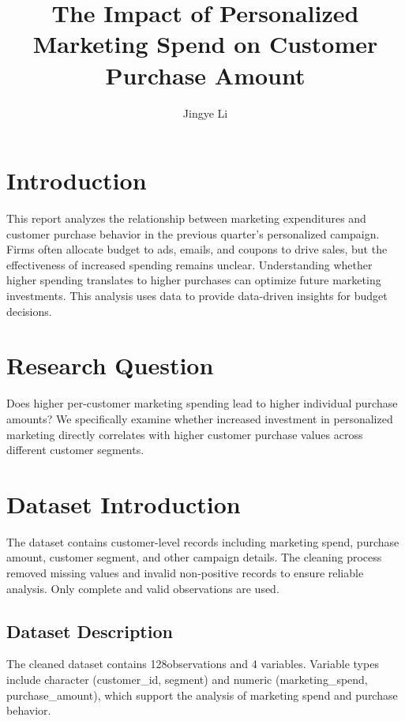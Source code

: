 \documentclass[
  letterpaper,
  DIV=11,
  numbers=noendperiod]{scrartcl}
\title{The Impact of Personalized Marketing Spend on Customer Purchase
Amount}
\author{Jingye Li}
\date{}
\renewcommand*\contentsname{Table of contents}
\newcommand\contentsname{Table of contents}
\begin{document}
\maketitle

\renewcommand*\contentsname{Table of contents}
{
\setcounter{tocdepth}{3}
\tableofcontents
}

\section{Introduction}\label{introduction}

This report analyzes the relationship between marketing expenditures and
customer purchase behavior in the previous quarter's personalized
campaign. Firms often allocate budget to ads, emails, and coupons to
drive sales, but the effectiveness of increased spending remains
unclear. Understanding whether higher spending translates to higher
purchases can optimize future marketing investments. This analysis uses
data to provide data-driven insights for budget decisions.

\section{Research Question}\label{research-question}

Does higher per-customer marketing spending lead to higher individual
purchase amounts? We specifically examine whether increased investment
in personalized marketing directly correlates with higher customer
purchase values across different customer segments.

\section{Dataset Introduction}\label{dataset-introduction}

The dataset contains customer-level records including marketing spend,
purchase amount, customer segment, and other campaign details. The
cleaning process removed missing values and invalid non-positive records
to ensure reliable analysis. Only complete and valid observations are
used.

\subsection{Dataset Description}\label{dataset-description}

The cleaned dataset contains 128observations and 4 variables. Variable
types include character (customer\_id, segment) and numeric
(marketing\_spend, purchase\_amount), which support the analysis of
marketing spend and purchase behavior.
\end{document}
